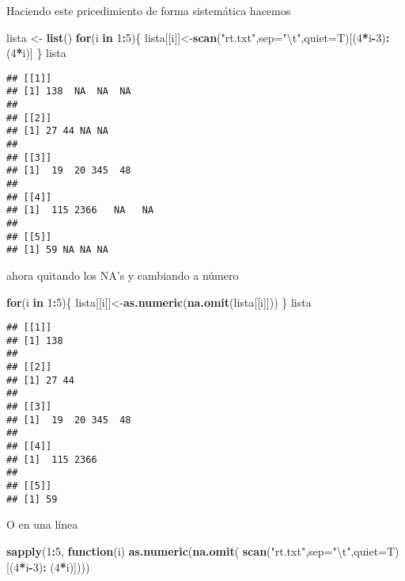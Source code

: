 \documentclass[]{article}
\newenvironment{Shaded}{\begin{snugshade}}{\end{snugshade}}
\newcommand{\KeywordTok}[1]{\textcolor[rgb]{0.13,0.29,0.53}{\textbf{#1}}}
\newcommand{\DataTypeTok}[1]{\textcolor[rgb]{0.13,0.29,0.53}{#1}}
\newcommand{\DecValTok}[1]{\textcolor[rgb]{0.00,0.00,0.81}{#1}}
\newcommand{\CharTok}[1]{\textcolor[rgb]{0.31,0.60,0.02}{#1}}
\newcommand{\StringTok}[1]{\textcolor[rgb]{0.31,0.60,0.02}{#1}}
\newcommand{\ControlFlowTok}[1]{\textcolor[rgb]{0.13,0.29,0.53}{\textbf{#1}}}
\newcommand{\OperatorTok}[1]{\textcolor[rgb]{0.81,0.36,0.00}{\textbf{#1}}}
\newcommand{\NormalTok}[1]{#1}
\begin{document}
Haciendo este pricedimiento de forma sistemática hacemos

\begin{Shaded}
\begin{Highlighting}[]
\NormalTok{lista <-}\StringTok{ }\KeywordTok{list}\NormalTok{()}
\ControlFlowTok{for}\NormalTok{(i }\ControlFlowTok{in} \DecValTok{1}\OperatorTok{:}\DecValTok{5}\NormalTok{)\{}
\NormalTok{  lista[[i]]<-}\KeywordTok{scan}\NormalTok{(}\StringTok{"rt.txt"}\NormalTok{,}\DataTypeTok{sep=}\StringTok{"}\CharTok{\textbackslash{}t}\StringTok{"}\NormalTok{,}\DataTypeTok{quiet=}\NormalTok{T)[(}\DecValTok{4}\OperatorTok{*}\NormalTok{i}\OperatorTok{-}\DecValTok{3}\NormalTok{)}\OperatorTok{:}\NormalTok{(}\DecValTok{4}\OperatorTok{*}\NormalTok{i)]}
\NormalTok{\}}
\NormalTok{lista}
\end{Highlighting}
\end{Shaded}

\begin{verbatim}
## [[1]]
## [1] 138  NA  NA  NA
## 
## [[2]]
## [1] 27 44 NA NA
## 
## [[3]]
## [1]  19  20 345  48
## 
## [[4]]
## [1]  115 2366   NA   NA
## 
## [[5]]
## [1] 59 NA NA NA
\end{verbatim}

ahora quitando los NA's y cambiando a número

\begin{Shaded}
\begin{Highlighting}[]
\ControlFlowTok{for}\NormalTok{(i }\ControlFlowTok{in} \DecValTok{1}\OperatorTok{:}\DecValTok{5}\NormalTok{)\{}
\NormalTok{  lista[[i]]<-}\KeywordTok{as.numeric}\NormalTok{(}\KeywordTok{na.omit}\NormalTok{(lista[[i]]))}
\NormalTok{\}}
\NormalTok{lista}
\end{Highlighting}
\end{Shaded}

\begin{verbatim}
## [[1]]
## [1] 138
## 
## [[2]]
## [1] 27 44
## 
## [[3]]
## [1]  19  20 345  48
## 
## [[4]]
## [1]  115 2366
## 
## [[5]]
## [1] 59
\end{verbatim}

O en una línea

\begin{Shaded}
\begin{Highlighting}[]
\KeywordTok{sapply}\NormalTok{(}\DecValTok{1}\OperatorTok{:}\DecValTok{5}\NormalTok{, }\ControlFlowTok{function}\NormalTok{(i)}
\KeywordTok{as.numeric}\NormalTok{(}\KeywordTok{na.omit}\NormalTok{(}
\KeywordTok{scan}\NormalTok{(}\StringTok{"rt.txt"}\NormalTok{,}\DataTypeTok{sep=}\StringTok{"}\CharTok{\textbackslash{}t}\StringTok{"}\NormalTok{,}\DataTypeTok{quiet=}\NormalTok{T)[(}\DecValTok{4}\OperatorTok{*}\NormalTok{i}\OperatorTok{-}\DecValTok{3}\NormalTok{)}\OperatorTok{:}
\NormalTok{(}\DecValTok{4}\OperatorTok{*}\NormalTok{i)])))}
\end{Highlighting}
\end{Shaded}
\end{document}
